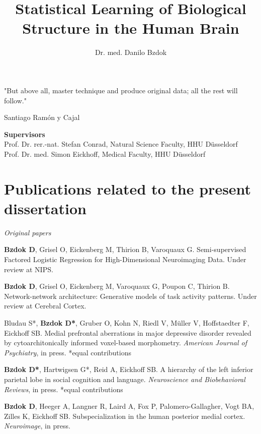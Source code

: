 \documentclass[authoryear,review,3p]{elsarticle}
\begin{document}
\begin{frontmatter}

\title{Statistical Learning of Biological Structure in the Human Brain}

\author{Dr. med. Danilo Bzdok}

\end{frontmatter}

\bigskip
\bigskip
\bigskip
\centerline{
"But above all, master technique and produce original data; 
all the rest will follow."}
\centerline{Santiago Ram\'{o}n y Cajal}

\bigskip
\bigskip
\bigskip

\textbf{Supervisors\\}
Prof. Dr. rer.-nat. Stefan Conrad, Natural Science Faculty, HHU Düsseldorf\\
Prof. Dr. med. Simon Eickhoff, Medical Faculty, HHU Düsseldorf


\bigskip

\newpage
\section*{Publications related to the present dissertation}
\linebreak
\textit{Original papers}

\textbf{Bzdok D}, Grisel O, Eickenberg M, Thirion B, Varoquaux G.
Semi-supervised Factored Logistic Regression for High-Dimensional
Neuroimaging Data. Under review at NIPS.

\textbf{Bzdok D}, Grisel O, Eickenberg M, Varoquaux G, Poupon C, Thirion B.
Network-network architecture: Generative models of task activity patterns.
Under review at Cerebral Cortex.

Bludau S*, \textbf{Bzdok D*}, Gruber O,
Kohn N, Riedl V, Müller V, Hoffstaedter F, Eickhoff SB.
Medial prefrontal aberrations in major depressive disorder
revealed by cytoarchitonically informed voxel-based morphometry.
\textit{American Journal of Psychiatry}, in press. *equal contributions

\textbf{Bzdok D*}, Hartwigsen G*, Reid A, Eickhoff SB.
A hierarchy of the left inferior parietal lobe in social cognition and
language.
\textit{Neuroscience and Biobehavioral Reviews}, in press. *equal contributions

\textbf{Bzdok D}, Heeger A, Langner R, Laird A, Fox P, Palomero-Gallagher,
Vogt BA, Zilles K, Eickhoff SB.
Subspecialization in the human posterior medial cortex.
\textit{Neuroimage}, in press.
\end{document}
